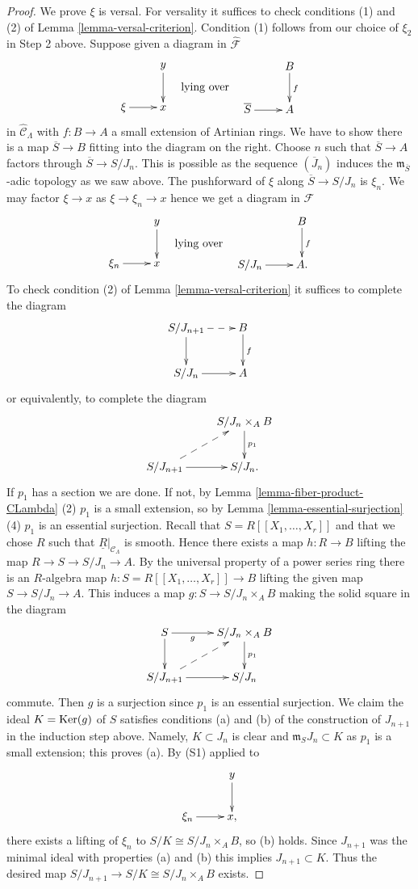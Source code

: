\begin{proof}
\medskip\noindent
We prove $\xi$ is versal. For versality it suffices to check
conditions (1) and (2) of
Lemma \ref{lemma-versal-criterion}.
Condition (1) follows from our choice of $\xi_2$ in Step 2 above.
Suppose given a diagram in $\widehat{\mathcal{F}}$
$$
\vcenter{
\xymatrix{
            &  y \ar[d] \\
\xi \ar[r]  &  x
}
}
\quad\text{lying over}\quad
\vcenter{
\xymatrix{
         &   B  \ar[d]^{f} \\
\overline{S} \ar[r] &   A
}
}
$$
in $\widehat{\mathcal{C}}_\Lambda$ with $f: B \to A$ a small extension
of Artinian rings. We have to show there is a map $\overline{S} \to B$ fitting
into the diagram on the right. Choose $n$ such that
$\overline{S} \to A$ factors through $\overline{S} \to S/J_n$. This is
possible as the sequence $(\overline{J}_n)$ induces the
$\mathfrak m_{\overline{S}}$-adic topology as we saw above.
The pushforward of $\xi$ along $\overline{S} \to S/J_n$ is $\xi_n$.
We may factor $\xi \to x$ as $\xi \to \xi_n \to x$ hence we get a diagram
in $\mathcal{F}$
$$
\vcenter{
\xymatrix{
            &  y \ar[d] \\
\xi_n \ar[r]  &  x
}
}
\quad\text{lying over}\quad
\vcenter{
\xymatrix{
         &   B  \ar[d]^{f} \\
S/J_n \ar[r] &   A .
}
}
$$
To check condition (2) of
Lemma \ref{lemma-versal-criterion}
it suffices to complete the diagram
$$
\xymatrix{
S/J_{n + 1} \ar[d] \ar@{-->}[r] & B \ar[d]^{f} \\
S/J_n   \ar[r] & A
}
$$
or equivalently, to complete the diagram
$$
\xymatrix{
  &  S/J_n \times_A B \ar[d]^{p_1} \\
S/J_{n + 1} \ar@{-->}[ur] \ar[r] &  S/J_n.
}
$$
If $p_1$ has a section we are done. If not, by
Lemma \ref{lemma-fiber-product-CLambda} (2)
$p_1$ is a small extension, so by
Lemma \ref{lemma-essential-surjection} (4)
$p_1$ is an essential surjection. Recall that $S = R[[X_1, \ldots, X_r]]$
and that we chose $R$ such that $\underline{R}|_{\mathcal{C}_\Lambda}$
is smooth. Hence there exists a map $h : R \to B$ lifting the map
$R \to S \to S/J_n \to A$. By the universal property of a power series
ring there is an $R$-algebra map $h : S = R[[X_1, \ldots, X_r]] \to B$
lifting the given map $S \to S/J_n \to A$. This induces a map
$g: S \to S/J_n \times_A B$ making the solid square in the diagram
$$
\xymatrix{
S \ar[d] \ar[r]_-g  &  S/J_n \times_A B \ar[d]^{p_1} \\
S/J_{n + 1} \ar@{-->}[ur] \ar[r] &  S/J_n
}
$$
commute. Then $g$ is a surjection since $p_1$ is an essential surjection.
We claim the ideal $K = \mathop{\mathrm{Ker}}(g)$ of $S$ satisfies conditions (a) and
(b) of the construction of $J_{n + 1}$ in the induction step above.
Namely, $K \subset J_n$ is clear and $\mathfrak m_SJ_n \subset K$ as $p_1$
is a small extension; this proves (a). By (S1) applied to
$$
\xymatrix{
            &  y \ar[d] \\
\xi_n \ar[r]  &  x,
}
$$
there exists a lifting of $\xi_n$ to $S/K \cong S/J_n \times_A B$, so (b)
holds. Since $J_{n + 1}$ was the minimal ideal with properties (a) and (b)
this implies $J_{n + 1} \subset K$. Thus the desired map
$S/J_{n+1} \to S/K \cong S/J_n \times_A B$ exists.
\end{proof}

